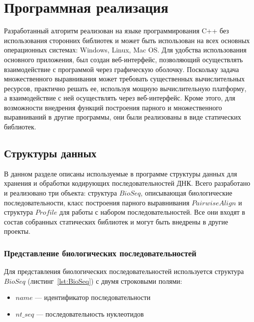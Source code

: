 \newpage

\section[Программная реализация]{\large \centering Программная реализация}
\hspace{\parindent} Разработанный алгоритм реализован на языке программирования C++ без использования сторонних библиотек и может быть использован на всех основных операционных системах: Windows, Linux, Mac OS. Для удобства использования основного приложения, был создан веб-интерфейс, позволяющий осуществлять взаимодействие с программой через графическую оболочку. Поскольку задача множественного выравнивания может требовать существенных вычислительных ресурсов, практично решать ее, используя мощную вычислительную платформу, а взаимодействие с ней осуществлять через веб-интерфейс. Кроме этого, для возможности внедрения функций построения парного и множественного выравниваний в другие программы, они были реализованы в виде статических библиотек.

\subsection[Структуры данных]{\large Структуры данных}
\hspace{\parindent} В данном разделе описаны используемые в программе структуры данных для хранения и обработки кодирующих последовательностей ДНК. Всего разработано и реализовано три объекта: структура $BioSeq$, описывающая биологические последовательности, класс построения парного выравнивания $PairwiseAlign$ и структура $Profile$ для работы с набором последовательностей. Все они входят в состав собранных статических библиотек и могут быть внедрены в другие проекты.

\subsubsection[Представление биологических последовательностей]{\large Представление биологических последовательностей}
\hspace{\parindent} Для представления биологических последовательностей используется структура $BioSeq$ (листинг~\ref{lst:BioSeq}) с двумя строковыми полями:
\begin{itemize}
	\item $name$ --- идентификатор последовательности
	\item $nt\_seq$ --- последовательность нуклеотидов
\end{itemize}

